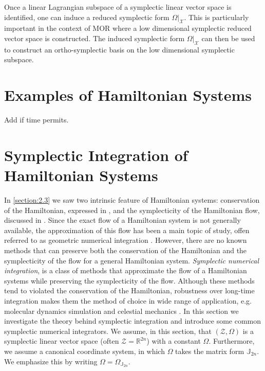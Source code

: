 Once a linear Lagrangian subspace of a symplectic linear vector space is identified, one can induce a reduced symplectic form $\Omega|_{\mathcal X}$. This is particularly important in the context of MOR where a low dimensional symplectic reduced vector space is constructed. The induced symplectic form $\Omega|_{\mathcal X}$ can then be used to construct an ortho-symplectic basis on the low dimensional symplectic subspace.

\section{Examples of Hamiltonian Systems} Add if time permits.

\section{Symplectic Integration of Hamiltonian Systems}
In \cref{section:2.3} we saw two intrinsic feature of Hamiltonian systems: conservation of the Hamiltonian, expressed in , and the symplecticity of the Hamiltonian flow, discussed in . Since the exact flow of a Hamiltonian system is not generally available, the approximation of this flow has been a main topic of study, offen referred to as geometric numerical integration \cite{hairer2006geometric,blanes2016concise}. However, there are no known methods that can preserve both the conservation of the Hamiltonian and the symplecticity of the flow for a general Hamiltonian system. \emph{Symplectic numerical integration}, is a class of methods that approximate the flow of a Hamiltonian systems while preserving the symplecticity of the flow. Although these methods tend to violated the conservation of the Hamiltonian, robustness over long-time integration makes them the method of choice in wide range of application, e.g. molecular dynamics simulation \cite{farantos2014nonlinear} and celestial mechanics \cite{schutz2004statistical}. In this section we investigate the theory behind symplectic integration and introduce some common symplectic numerical integrators. We assume, in this section, that $(\mathcal Z, \Omega)$ is a symplectic linear vector space (often $\mathcal Z = \mathbb R^{2n}$) with a constant $\Omega$. Furthermore, we assume a canonical coordinate system, in which $\Omega$ takes the matrix form $\mathbb J_{2n}$. We emphasize this by writing $\Omega = \Omega_{\mathbb J_{2n}}$.

